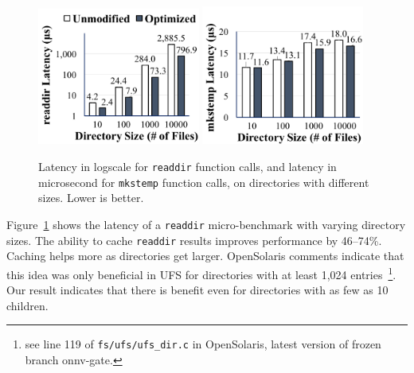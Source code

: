 \begin{figure}
\scriptsize
\centering
\includegraphics[width=2.1in]{dcache/plots/lm_readdir.pdf}
\hspace{1in}
\includegraphics[width=2.1in]{dcache/plots/lm_mkstemp.pdf}
\caption[Directory cache optimization: {\tt readdir} and {\tt mkstemp} latency.]
{Latency in logscale for {\tt readdir} function calls, and latency in microsecond for {\tt mkstemp} function calls, on directories with different sizes. Lower is better. }
\label{fig:dcache:readdir}
\end{figure}

Figure~\ref{fig:dcache:readdir} shows the latency 
of a {\tt readdir} micro-benchmark with varying directory sizes.
The ability to cache {\tt readdir} results improves performance by 46--74\%.
Caching helps more as directories get larger.
OpenSolaris comments indicate that this idea was only beneficial 
in UFS for directories with at least 1,024 entries~\footnote{see line 119 of {\tt fs/ufs/ufs\_dir.c} in OpenSolaris, latest version of frozen branch onnv-gate.}.
Our result indicates that there is benefit even for directories with as few as 10 children.

